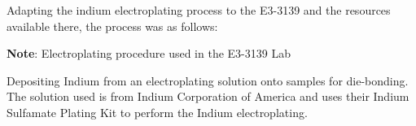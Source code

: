 Adapting the indium electroplating process to the E3-3139 and the resources available there, the process was as follows:

\begin{center} %
\begin{framed} %
    \begin{minipage}{0.8\textwidth} %
    \raggedright %
    \textbf{Note}: Electroplating procedure used in the E3-3139 Lab

    \vspace{0.5cm} %

Depositing Indium from an electroplating solution onto samples for die-bonding. The solution used is from Indium Corporation of America and uses their Indium Sulfamate Plating Kit to perform the Indium electroplating.

\begin{center}


\end{center}
\end{minipage}
\end{framed}
\end{center}
